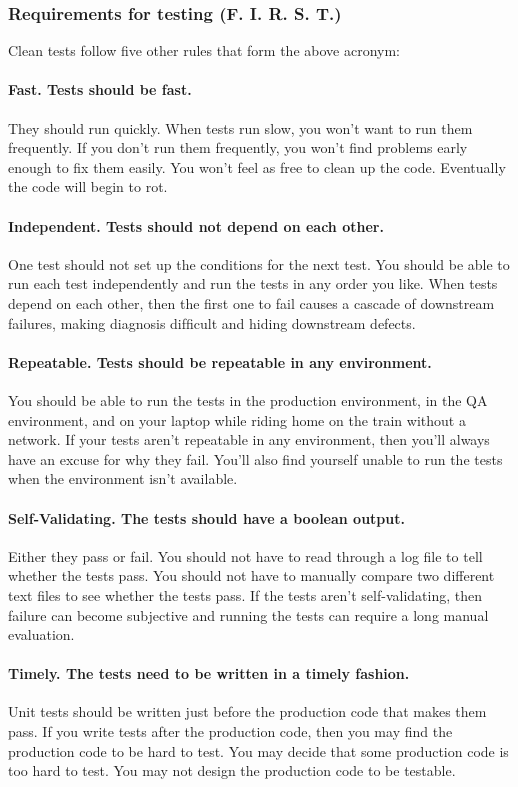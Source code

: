 \documentclass{llncs}
\begin{document}
\subsubsection{Requirements for testing (F. I. R. S. T.)}
Clean tests follow ﬁve other rules that form the above acronym:
\paragraph{Fast. Tests should be fast.} 
They should run quickly. When tests run slow, you won’t want to run them frequently. 
If you don’t run them frequently, you won’t ﬁnd problems early enough to ﬁx them easily. 
You won’t feel as free to clean up the code. Eventually the code will begin to rot.

\paragraph{Independent. Tests should not depend on each other.} 
One test should not set up the conditions for the next test. 
You should be able to run each test independently and run the tests in any order you like. 
When tests depend on each other, then the ﬁrst one to fail causes a cascade of downstream failures, making diagnosis difﬁcult and hiding downstream defects.

\paragraph{Repeatable. Tests should be repeatable in any environment.}
You should be able to run the tests in the production environment, in the QA environment, and on your laptop while riding home on the train without a network. 
If your tests aren’t repeatable in any environment, then you’ll always have an excuse for why they fail. 
You’ll also ﬁnd yourself unable to run the tests when the environment isn’t available.

\paragraph{Self-Validating. The tests should have a boolean output.}
Either they pass or fail. 
You should not have to read through a log ﬁle to tell whether the tests pass. 
You should not have to manually compare two different text ﬁles to see whether the tests pass. 
If the tests aren’t self-validating, then failure can become subjective and running the tests can require a long manual evaluation.

\paragraph{Timely. The tests need to be written in a timely fashion.}
Unit tests should be written just before the production code that makes them pass. 
If you write tests after the production code, then you may ﬁnd the production code to be hard to test. 
You may decide that some production code is too hard to test. 
You may not design the production code to be testable.
\end{document}
